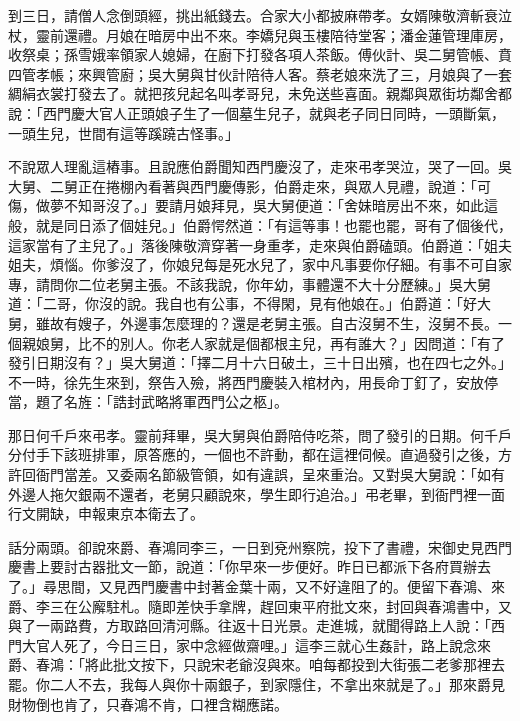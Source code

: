 到三日，請僧人念倒頭經，挑出紙錢去。合家大小都披麻帶孝。女婿陳敬濟斬衰泣杖，靈前還禮。月娘在暗房中出不來。李嬌兒與玉樓陪待堂客；潘金蓮管理庫房，收祭桌；孫雪娥率領家人媳婦，在廚下打發各項人茶飯。傅伙計、吳二舅管帳、賁四管孝帳；來興管廚；吳大舅與甘伙計陪待人客。蔡老娘來洗了三，月娘與了一套綢絹衣裳打發去了。就把孩兒起名叫孝哥兒，未免送些喜面。親鄰與眾街坊鄰舍都說：「西門慶大官人正頭娘子生了一個墓生兒子，就與老子同日同時，一頭斷氣，一頭生兒，世間有這等蹊蹺古怪事。」

不說眾人理亂這樁事。且說應伯爵聞知西門慶沒了，走來弔孝哭泣，哭了一回。吳大舅、二舅正在捲棚內看著與西門慶傳影，伯爵走來，與眾人見禮，說道：「可傷，做夢不知哥沒了。」要請月娘拜見，吳大舅便道：「舍妹暗房出不來，如此這般，就是同日添了個娃兒。」伯爵愕然道：「有這等事！也罷也罷，哥有了個後代，這家當有了主兒了。」落後陳敬濟穿著一身重孝，走來與伯爵磕頭。伯爵道：「姐夫姐夫，煩惱。你爹沒了，你娘兒每是死水兒了，家中凡事要你仔細。有事不可自家專，請問你二位老舅主張。不該我說，你年幼，事體還不大十分歷練。」吳大舅道：「二哥，你沒的說。我自也有公事，不得閑，見有他娘在。」伯爵道：「好大舅，雖故有嫂子，外邊事怎麼理的？還是老舅主張。自古沒舅不生，沒舅不長。一個親娘舅，比不的別人。你老人家就是個都根主兒，再有誰大？」因問道：「有了發引日期沒有？」吳大舅道：「擇二月十六日破土，三十日出殯，也在四七之外。」不一時，徐先生來到，祭告入殮，將西門慶裝入棺材內，用長命丁釘了，安放停當，題了名旌：「誥封武略將軍西門公之柩」。

那日何千戶來弔孝。靈前拜畢，吳大舅與伯爵陪侍吃茶，問了發引的日期。何千戶分付手下該班排軍，原答應的，一個也不許動，都在這裡伺候。直過發引之後，方許回衙門當差。又委兩名節級管領，如有違誤，呈來重治。又對吳大舅說：「如有外邊人拖欠銀兩不還者，老舅只顧說來，學生即行追治。」弔老畢，到衙門裡一面行文開缺，申報東京本衛去了。

話分兩頭。卻說來爵、春鴻同李三，一日到兗州察院，投下了書禮，宋御史見西門慶書上要討古器批文一節，說道：「你早來一步便好。昨日已都派下各府買辦去了。」尋思間，又見西門慶書中封著金葉十兩，又不好違阻了的。便留下春鴻、來爵、李三在公廨駐札。隨即差快手拿牌，趕回東平府批文來，封回與春鴻書中，又與了一兩路費，方取路回清河縣。往返十日光景。走進城，就聞得路上人說：「西門大官人死了，今日三日，家中念經做齋哩。」這李三就心生姦計，路上說念來爵、春鴻：「將此批文按下，只說宋老爺沒與來。咱每都投到大街張二老爹那裡去罷。你二人不去，我每人與你十兩銀子，到家隱住，不拿出來就是了。」那來爵見財物倒也肯了，只春鴻不肯，口裡含糊應諾。

